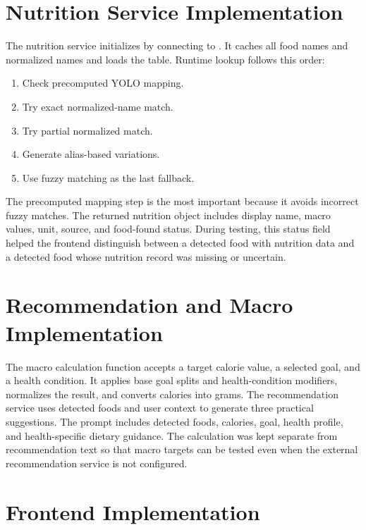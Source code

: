 \section{Nutrition Service Implementation}

The nutrition service initializes by connecting to . It caches all food names and normalized names and loads the  table. Runtime lookup follows this order:

\begin{enumerate}[label=\arabic*.]
    \item Check precomputed YOLO mapping.
    \item Try exact normalized-name match.
    \item Try partial normalized match.
    \item Generate alias-based variations.
    \item Use fuzzy matching as the last fallback.
\end{enumerate}

The precomputed mapping step is the most important because it avoids incorrect fuzzy matches. The returned nutrition object includes display name, macro values, unit, source, and food-found status. During testing, this status field helped the frontend distinguish between a detected food with nutrition data and a detected food whose nutrition record was missing or uncertain.

\section{Recommendation and Macro Implementation}

The macro calculation function accepts a target calorie value, a selected goal, and a health condition. It applies base goal splits and health-condition modifiers, normalizes the result, and converts calories into grams. The recommendation service uses detected foods and user context to generate three practical suggestions. The prompt includes detected foods, calories, goal, health profile, and health-specific dietary guidance. The calculation was kept separate from recommendation text so that macro targets can be tested even when the external recommendation service is not configured.

\section{Frontend Implementation}

